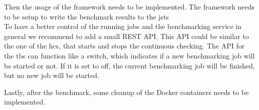 Then the usage of the \iguana{} framework needs to be implemented.
The framework needs to be setup to write the benchmark results to the \ac{jsts}
\\

To have a better control of the running jobs and the benchmarking service in general we recommend to add a small REST API.
This API could be similar to the one of the \ac{hcs}, that starts and stops the continuous checking.
The API for the \ac{tbs} can function like a switch, which indicates if a new benchmarking job will be started or not.
If it is set to off, the current benchmarking job will be finished, but no new job will be started.

Lastly, after the benchmark, some cleanup of the Docker containers needs to be implemented.


